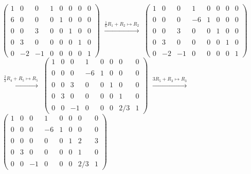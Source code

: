 \documentclass{article}
\begin{document}
$\begin{pmatrix}1 & 0 & 0 & 1 & 0 & 0 & 0 & 0\\\\6 & 0 & 0 & 0 & 1 & 0
  & 0 & 0\\\\0 & 0 & 3 & 0 & 0 & 1 & 0 & 0\\\\0 & 3 & 0 & 0 & 0 & 0 &
  1 & 0\\\\0 & -2 & -1 & 0 & 0 & 0 & 0 & 1\end{pmatrix}$
$\xrightarrow[]{\frac{1}{6}R_1+R_2 \mapsto R_2}$
$\begin{pmatrix}1 & 0 & 0 & 1 & 0 & 0 & 0 & 0\\\\0 & 0 & 0 & -6 & 1 &
  0 & 0 & 0\\\\0 & 0 & 3 & 0 & 0 & 1 & 0 & 0\\\\0 & 3 & 0 & 0 & 0 & 0
  & 1 & 0\\\\0 & -2 & -1 & 0 & 0 & 0 & 0 & 1\end{pmatrix}$\\
$\xrightarrow[]{\frac{2}{3}R_4+R_5 \mapsto R_5}$
$\begin{pmatrix}1 & 0 & 0 & 1 & 0 & 0 & 0 & 0\\\\0 & 0 & 0 & -6 & 1 &
  0 & 0 & 0\\\\0 & 0 & 3 & 0 & 0 & 1 & 0 & 0\\\\0 & 3 & 0 & 0 & 0 & 0
  & 1 & 0\\\\0 & 0 & -1 & 0 & 0 & 0 & 2/3 & 1\end{pmatrix}$
$\xrightarrow[]{3R_5+R_3 \mapsto R_3}$
$\begin{pmatrix}1 & 0 & 0 & 1 & 0 & 0 & 0 & 0\\\\0 & 0 & 0 & -6 & 1 &
  0 & 0 & 0\\\\0 & 0 & 0 & 0 & 0 & 1 & 2 & 3\\\\0 & 3 & 0 & 0 & 0 & 0
  & 1 & 0\\\\0 & 0 & -1 & 0 & 0 & 0 & 2/3 & 1\end{pmatrix}$\\
\end{document}

